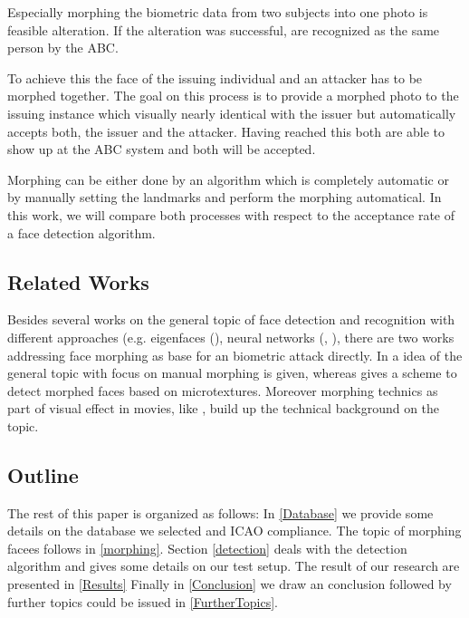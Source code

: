 Especially morphing the biometric data from two subjects into one photo is feasible alteration. If the alteration was successful, are recognized as the same person by the ABC. 

To achieve this the face of the issuing individual and an attacker has to be morphed together. The goal on this process is to provide a morphed photo to the issuing instance which visually nearly identical with the issuer but automatically accepts both, the issuer and the attacker. Having reached this both are able to show up at the ABC system and both will be accepted. 

Morphing can be either done by an algorithm which is completely automatic or by manually setting the landmarks and perform the morphing automatical. In this work, we will compare both processes with respect to the acceptance rate of a face detection algorithm. 

\subsection{Related Works}
Besides several works on the general topic of face detection \cite{jagathishwaran2014survey} and recognition with different approaches (e.g. eigenfaces (\cite{turk1991face}), neural networks (\cite{rowley1998neural}, \cite{lawrence1997face}), there are two works addressing face morphing as base for an biometric attack directly. In \cite{ferrara2014magic} a idea of the general topic with focus on manual morphing is given, whereas \cite{raghavendra2016detecting} gives a scheme to detect morphed faces based on microtextures.
Moreover morphing technics as part of visual effect in movies, like \cite{wolberg1998image}, build up the technical background on the topic. 

\subsection{Outline}
The rest of this paper is organized as follows: In \autoref{Database} we provide some details on the database we selected and ICAO compliance. The topic of morphing facees follows in \autoref{morphing}. Section \ref{detection} deals with the detection algorithm and gives some details on our test setup. The result of our research are presented in \autoref{Results} Finally in \autoref{Conclusion} we draw an conclusion followed by further topics could be issued in \autoref{FurtherTopics}.
 